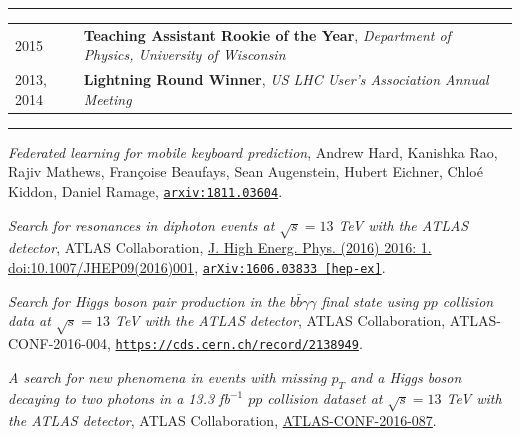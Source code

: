 \documentclass{letter}
\begin{document}
\vspace{-10pt}

\begin{flushleft}
\Large{\textsc{\textbf{\color{Maroon}{Awards}}}}
\vspace{1pt} %
\hrule
\end{flushleft}

\begin{tabular}{p{}p{}}
	2015
	&
	\textbf{Teaching Assistant Rookie of the Year}, \textit{Department of Physics, University of Wisconsin} 
\\
	2013, 2014
	& 
	\textbf{Lightning Round Winner}, \textit{US LHC User's Association Annual Meeting}
\\
\end{tabular}


\begin{flushleft}
\Large{\textsc{\textbf{\color{Maroon}{Selected Publications}}}}
\vspace{1pt} %
\hrule
\end{flushleft}

\textit{Federated learning for mobile keyboard prediction}, Andrew Hard, Kanishka Rao, Rajiv Mathews, Fran{\c c}oise Beaufays, Sean Augenstein, Hubert Eichner, Chlo{\'e} Kiddon, Daniel Ramage, \href{https://arxiv.org/abs/1811.03604}{\texttt{arxiv:1811.03604}}.

\textit{Search for resonances in diphoton events at $\sqrt{s}=13$ TeV with the ATLAS detector}, ATLAS Collaboration, \href{http://link.springer.com/article/10.1007/JHEP09(2016)001}{J. High Energ. Phys. (2016) 2016: 1. doi:10.1007/JHEP09(2016)001}, \href{http://arxiv.org/abs/1606.03833}{\texttt{arXiv:1606.03833 [hep-ex]}}.

\textit{Search for Higgs boson pair production in the $b \bar{b} \gamma \gamma$ final state using $pp$ collision data at $\sqrt{s}=13$ TeV with the ATLAS detector}, ATLAS Collaboration, ATLAS-CONF-2016-004, \href{https://cds.cern.ch/record/2138949}{\texttt{https://cds.cern.ch/record/2138949}}.

\textit{A search for new phenomena in events with missing $p_{T}$ and a Higgs boson decaying to two photons in a 13.3 fb$^{-1}$ $pp$ collision dataset at $\sqrt{s}=13$ TeV with the ATLAS detector}, ATLAS Collaboration, \href{https://cds.cern.ch/record/2206281}{ATLAS-CONF-2016-087}.
\end{document}
